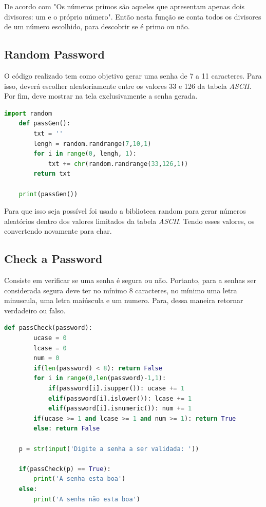 De acordo com  "Os números primos são aqueles que apresentam apenas dois divisores: um e o próprio número". Então nesta função se conta todos os divisores de um número escolhido, para descobrir se é primo ou não.

\subsection{Random Password}

O código realizado tem como objetivo gerar uma senha de 7 a 11 caracteres. Para isso, deverá escolher aleatoriamente entre os valores 33 e 126 da tabela \textit{ASCII}. Por fim, deve mostrar na tela exclusivamente a senha gerada.

\begin{lstlisting}[language=Python]
    import random
    def passGen():
        txt = ''
        lengh = random.randrange(7,10,1)
        for i in range(0, lengh, 1):
            txt += chr(random.randrange(33,126,1))
        return txt

    print(passGen())

\end{lstlisting}

Para que isso seja possível foi usado a biblioteca random para gerar números aleatórios dentro dos valores limitados da tabela \textit{ASCII}. Tendo esses valores, os convertendo novamente para char.


\subsection{Check a Password}

Consiste em verificar se uma senha é segura ou não. Portanto, para a senhas ser considerada segura deve ter no mínimo 8 caracteres, no mínimo uma letra minuscula, uma letra maiúscula e um numero. Para, dessa maneira retornar verdadeiro ou falso.

\begin{lstlisting}[language=Python]
    def passCheck(password):
        ucase = 0
        lcase = 0
        num = 0
        if(len(password) < 8): return False
        for i in range(0,len(password)-1,1):
            if(password[i].isupper()): ucase += 1
            elif(password[i].islower()): lcase += 1
            elif(password[i].isnumeric()): num += 1
        if(ucase >= 1 and lcase >= 1 and num >= 1): return True
        else: return False

    p = str(input('Digite a senha a ser validada: '))

    if(passCheck(p) == True):
        print('A senha esta boa')
    else:
        print('A senha não esta boa')

\end{lstlisting}

